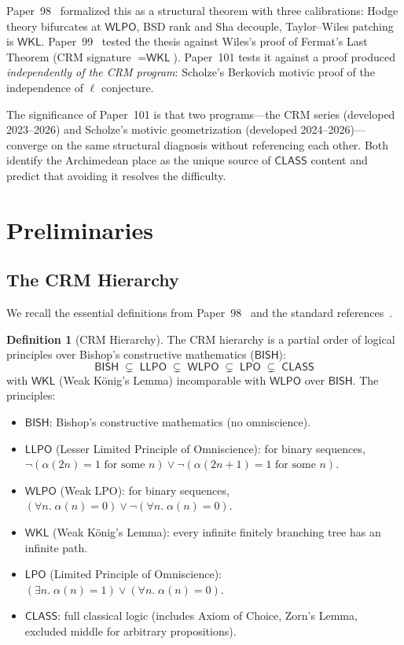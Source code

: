 \documentclass[11pt,a4paper]{article}
\theoremstyle{plain}
\theoremstyle{definition}
\newtheorem{definition}[theorem]{Definition}
\newcommand{\BISH}{\textsf{BISH}}
\newcommand{\WKL}{\textsf{WKL}}
\newcommand{\WLPO}{\textsf{WLPO}}
\newcommand{\LLPO}{\textsf{LLPO}}
\newcommand{\LPO}{\textsf{LPO}}
\newcommand{\CLASS}{\textsf{CLASS}}
\begin{document}
Paper~98~\cite{lee-p98} formalized this as a structural theorem with three calibrations: Hodge theory bifurcates at $\WLPO$, BSD rank and Sha decouple, Taylor--Wiles patching is $\WKL$. Paper~99~\cite{lee-p99} tested the thesis against Wiles's proof of Fermat's Last Theorem (CRM signature $= \WKL$). Paper~101 tests it against a proof produced \emph{independently of the CRM program}: Scholze's Berkovich motivic proof of the independence of $\ell$ conjecture.

The significance of Paper~101 is that two programs---the CRM series (developed 2023--2026) and Scholze's motivic geometrization (developed 2024--2026)---converge on the same structural diagnosis without referencing each other. Both identify the Archimedean place as the unique source of $\CLASS$ content and predict that avoiding it resolves the difficulty.


\section{Preliminaries}\label{sec:prelim}

\subsection{The CRM Hierarchy}

We recall the essential definitions from Paper~98~\cite{lee-p98} and the standard references~\cite{bishop-bridges85, bridges-richman87}.

\begin{definition}[CRM Hierarchy]\label{def:hierarchy}
The CRM hierarchy is a partial order of logical principles over Bishop's constructive mathematics ($\BISH$):
\[
\BISH \;\subsetneq\; \LLPO \;\subsetneq\; \WLPO \;\subsetneq\; \LPO \;\subsetneq\; \CLASS
\]
with $\WKL$ (Weak K\"onig's Lemma) incomparable with $\WLPO$ over $\BISH$. The principles:
\begin{itemize}
\item $\BISH$: Bishop's constructive mathematics (no omniscience).
\item $\LLPO$ (Lesser Limited Principle of Omniscience): for binary sequences, $\neg(\alpha(2n)=1 \text{ for some } n) \lor \neg(\alpha(2n+1)=1 \text{ for some } n)$.
\item $\WLPO$ (Weak LPO): for binary sequences, $(\forall n.\; \alpha(n)=0) \lor \neg(\forall n.\; \alpha(n)=0)$.
\item $\WKL$ (Weak K\"onig's Lemma): every infinite finitely branching tree has an infinite path.
\item $\LPO$ (Limited Principle of Omniscience): $(\exists n.\; \alpha(n)=1) \lor (\forall n.\; \alpha(n)=0)$.
\item $\CLASS$: full classical logic (includes Axiom of Choice, Zorn's Lemma, excluded middle for arbitrary propositions).
\end{itemize}
\end{definition}
\end{document}
